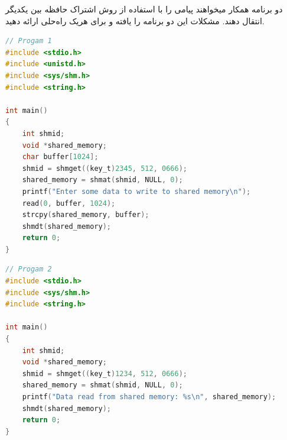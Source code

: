 
\question[10]  دو برنامه همکار میخواهند پیامی را با استفاده از روش اشتراک حافظه بین یکدیگر انتقال دهند.
مشکلات این دو برنامه را یافته و برای هریک راه‌حلی ارائه دهید.

\begin{latin}
    \begin{lstlisting}[language=C]
// Progam 1
#include <stdio.h>
#include <unistd.h>
#include <sys/shm.h>
#include <string.h>

int main()
{
    int shmid;
    void *shared_memory;
    char buffer[1024];
    shmid = shmget((key_t)2345, 512, 0666);
    shared_memory = shmat(shmid, NULL, 0);
    printf("Enter some data to write to shared memory\n");
    read(0, buffer, 1024);
    strcpy(shared_memory, buffer);
    shmdt(shared_memory);
    return 0;
}       
\end{lstlisting}
\end{latin}
\begin{latin}
    \begin{lstlisting}[language=C]
// Progam 2
#include <stdio.h>
#include <sys/shm.h>
#include <string.h>

int main()
{
    int shmid;
    void *shared_memory;
    shmid = shmget((key_t)1234, 512, 0666);
    shared_memory = shmat(shmid, NULL, 0);
    printf("Data read from shared memory: %s\n", shared_memory);
    shmdt(shared_memory);
    return 0;
}    
\end{lstlisting}
\end{latin}
